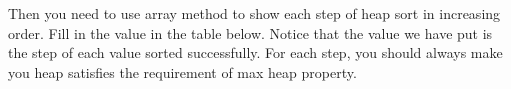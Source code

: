 \documentclass[10.5pt]{article}
\begin{document}
\begin{minipage}{1\textwidth}
\centering
{}
\end{minipage}%

Then you need to use array method to show each step of heap sort in increasing order. Fill in the value in the table below. Notice that the value we have put is the step of each value sorted successfully. For each step, you should always make you heap satisfies the requirement of max heap property.
\end{document}
